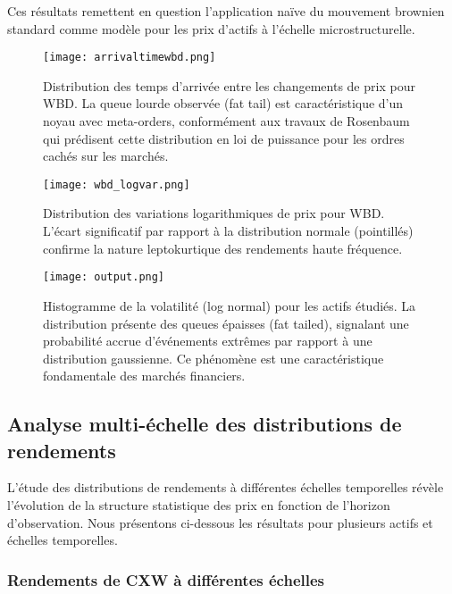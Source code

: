 \documentclass[12pt,a4paper]{article}
\theoremstyle{definition}
\theoremstyle{remark}
\begin{document}
Ces résultats remettent en question l'application naïve du mouvement brownien standard comme modèle pour les prix d'actifs à l'échelle microstructurelle.

\begin{figure}[h!]
    \centering
    \texttt{[image: arrivaltimewbd.png]}
    \caption{Distribution des temps d'arrivée entre les changements de prix pour WBD. La queue lourde observée (fat tail) est caractéristique d'un noyau avec meta-orders, conformément aux travaux de Rosenbaum qui prédisent cette distribution en loi de puissance pour les ordres cachés sur les marchés.}
    \label{fig:arrival_times_wbd}
\end{figure}

\begin{figure}[h!]
    \centering
    \texttt{[image: wbd\_logvar.png]}
    \caption{Distribution des variations logarithmiques de prix pour WBD. L'écart significatif par rapport à la distribution normale (pointillés) confirme la nature leptokurtique des rendements haute fréquence.}
    \label{fig:log_variations_wbd}
\end{figure}

\begin{figure}[h!]
    \centering
    \texttt{[image: output.png]}
    \caption{Histogramme de la volatilité (log normal) pour les actifs étudiés. La distribution présente des queues épaisses (fat tailed), signalant une probabilité accrue d'événements extrêmes par rapport à une distribution gaussienne. Ce phénomène est une caractéristique fondamentale des marchés financiers.}
    \label{fig:volatility_hist}
\end{figure}

\subsection{Analyse multi-échelle des distributions de rendements}

L'étude des distributions de rendements à différentes échelles temporelles révèle l'évolution de la structure statistique des prix en fonction de l'horizon d'observation. Nous présentons ci-dessous les résultats pour plusieurs actifs et échelles temporelles.

\subsubsection{Rendements de CXW à différentes échelles}
\end{document}
